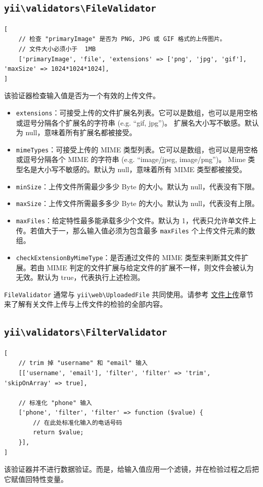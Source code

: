 \subsection{\texttt{yii{\allowbreak{}\textbackslash}validators{\allowbreak{}\textbackslash}FileValidator} \label{tutorial-core-validators.md::file}}
\lstset{language=php}\begin{lstlisting}
[
    // 检查 "primaryImage" 是否为 PNG, JPG 或 GIF 格式的上传图片。
    // 文件大小必须小于  1MB
    ['primaryImage', 'file', 'extensions' => ['png', 'jpg', 'gif'], 'maxSize' => 1024*1024*1024],
]
\end{lstlisting}
该验证器检查输入值是否为一个有效的上传文件。

\begin{itemize}
\item \lstinline|extensions|：可接受上传的文件扩展名列表。它可以是数组，也可以是用空格或逗号分隔各个扩展名的字符串 (e.g. ``gif, jpg'')。
扩展名大小写不敏感。默认为 null，意味着所有扩展名都被接受。
\item \lstinline|mimeTypes|：可接受上传的 MIME 类型列表。它可以是数组，也可以是用空格或逗号分隔各个 MIME 的字符串 (e.g. ``image/jpeg, image/png'')。
Mime 类型名是大小写不敏感的。默认为 null，意味着所有 MIME 类型都被接受。
\item \lstinline|minSize|：上传文件所需最少多少 Byte 的大小。默认为 null，代表没有下限。
\item \lstinline|maxSize|：上传文件所需最多多少 Byte 的大小。默认为 null，代表没有上限。
\item \lstinline|maxFiles|：给定特性最多能承载多少个文件。默认为 1，代表只允许单文件上传。若值大于一，那么输入值必须为包含最多 \lstinline|maxFiles| 个上传文件元素的数组。
\item \lstinline|checkExtensionByMimeType|：是否通过文件的 MIME 类型来判断其文件扩展。若由 MIME 判定的文件扩展与给定文件的扩展不一样，则文件会被认为无效。默认为 true，代表执行上述检测。
\end{itemize}
\lstinline|FileValidator| 通常与 \texttt{yii{\allowbreak{}\textbackslash}web{\allowbreak{}\textbackslash}UploadedFile} 共同使用。请参考 \hyperref[input-file-upload.md]{文件上传}章节来了解有关文件上传与上传文件的检验的全部内容。

\subsection{\texttt{yii{\allowbreak{}\textbackslash}validators{\allowbreak{}\textbackslash}FilterValidator} \label{tutorial-core-validators.md::filter}}
\lstset{language=php}\begin{lstlisting}
[
    // trim 掉 "username" 和 "email" 输入
    [['username', 'email'], 'filter', 'filter' => 'trim', 'skipOnArray' => true],

    // 标准化 "phone" 输入
    ['phone', 'filter', 'filter' => function ($value) {
        // 在此处标准化输入的电话号码
        return $value;
    }],
]
\end{lstlisting}
该验证器并不进行数据验证。而是，给输入值应用一个滤镜，并在检验过程之后把它赋值回特性变量。

